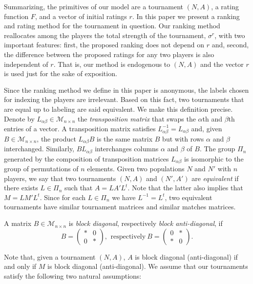 \documentclass[a4paper,10pt]{article}
\theoremstyle{remark}
\newcommand{\TM}{A} %
\newcommand{\GM}{B} %
\newcommand{\TS}{\sigma^\rv} %
\newcommand{\MS}{\mathcal M} %
\newcommand{\rv}{r} %
\begin{document}
Summarizing, the primitives of our model are a tournament
$(N,\TM)$, a rating function $F$, and a vector of initial ratings
$\rv$. In this paper we present a ranking and rating method for
the tournament in question. Our ranking method reallocates among
the players the total strength of the tournament, $\TS$, with two
important features: first, the proposed ranking does not depend on
$\rv$ and, second, the difference between the proposed ratings for
any two players is also independent of $\rv$. That is, our method
is endogenous to $(N,\TM)$ and the vector $\rv$ is used just for
the sake of exposition.

Since the ranking method we define in this paper is anonymous, the
labels chosen for indexing the players are irrelevant. Based on
this fact, two tournaments that are equal up to labeling are said
equivalent. We make this definition precise. Denote by
$L_{\alpha\beta}\in \MS_{n\times n}$ the \emph{transposition
matrix} that swaps the $\alpha$th and $\beta$th entries of a
vector. A transposition matrix satisfies
$L_{\alpha\beta}^{-1}=L_{\alpha\beta}$ and, given 
$\GM\in \MS_{n\times n}$, the product $L_{\alpha\beta}\GM$ is the
same matrix $\GM$ but with rows $\alpha$ and $\beta$ interchanged.
Similarly, $\GM L_{\alpha\beta}$ interchanges columns $\alpha$ and
$\beta$ of $\GM$. The group $\Pi_n$ generated by the composition
of transposition matrices $L_{\alpha\beta}$ is isomorphic to the
group of permutations of $n$ elements. Given two populations $N$ and $N'$ with $n$ players, we say that two tournaments
$(N,\TM)$ and $(N',\TM')$ are \emph{equivalent} if there exists
$L\in\Pi_n$ such that $\TM=L\TM'L^t$. Note that the latter also
implies that $M=LM'L^t$. Since for each $L\in\Pi_n$ we have
$L^{-1}=L^t$, two equivalent tournaments have similar tournament
matrices and similar matches matrices.

A matrix $\GM\in\MS_{n\times n}$ is \emph{block diagonal},
respectively \emph{block anti-diagonal}, if
\[
\GM=\left(\begin{array}{c|c}*&0\\\hline 0&*\end{array}\right),\, \
\mbox{respectively}\ \GM=\left(\begin{array}{c|c}0&*\\\hline
*&0\end{array}\right).
\]

Note that, given a tournament $(N,\TM)$, $\TM$ is block diagonal
(anti-diagonal) if and only if $M$ is block diagonal
(anti-diagonal). We assume that our tournaments satisfy the
following two natural assumptions:
\end{document}
